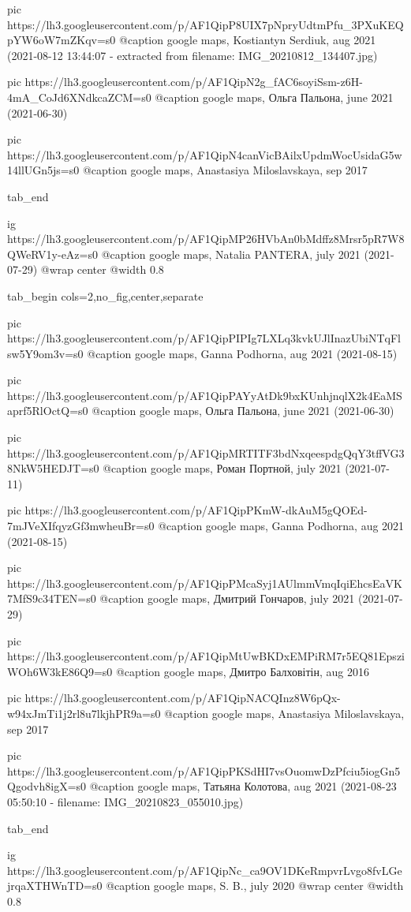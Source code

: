 		 pic https://lh3.googleusercontent.com/p/AF1QipP8UIX7pNpryUdtmPfu_3PXuKEQpYW6oW7mZKqv=s0
		 @caption google maps, Kostiantyn Serdiuk, aug 2021 (2021-08-12 13:44:07 - extracted from filename: IMG_20210812_134407.jpg)

		 pic https://lh3.googleusercontent.com/p/AF1QipN2g_fAC6soyiSsm-z6H-4mA_CoJd6XNdkcaZCM=s0
		 @caption google maps, Ольга Пальона, june 2021 (2021-06-30)

		 pic https://lh3.googleusercontent.com/p/AF1QipN4canVicBAilxUpdmWocUsidaG5w14llUGn5js=s0
		 @caption google maps, Anastasiya Miloslavskaya, sep 2017

  tab_end
\fi

\ifcmt
  ig https://lh3.googleusercontent.com/p/AF1QipMP26HVbAn0bMdffz8Mrsr5pR7W8QWeRV1y-eAz=s0
	@caption google maps, Natalia PANTERA, july 2021 (2021-07-29)
  @wrap center
  @width 0.8
\fi


\ifcmt
  tab_begin cols=2,no_fig,center,separate

		pic https://lh3.googleusercontent.com/p/AF1QipPIPIg7LXLq3kvkUJlInazUbiNTqFlsw5Y9om3v=s0
		@caption google maps, Ganna Podhorna, aug 2021 (2021-08-15)

		pic https://lh3.googleusercontent.com/p/AF1QipPAYyAtDk9bxKUnhjnqlX2k4EaMSaprf5RlOctQ=s0
		@caption google maps, Ольга Пальона, june 2021 (2021-06-30)

		pic https://lh3.googleusercontent.com/p/AF1QipMRTITF3bdNxqeespdgQqY3tffVG38NkW5HEDJT=s0
		@caption google maps, Роман Портной, july 2021 (2021-07-11)

		pic https://lh3.googleusercontent.com/p/AF1QipPKmW-dkAuM5gQOEd-7mJVeXIfqyzGf3mwheuBr=s0
		@caption google maps, Ganna Podhorna, aug 2021 (2021-08-15)

		pic https://lh3.googleusercontent.com/p/AF1QipPMcaSyj1AUlmmVmqIqiEhcsEaVK7MfS9c34TEN=s0
		@caption google maps, Дмитрий Гончаров, july 2021 (2021-07-29)

		pic https://lh3.googleusercontent.com/p/AF1QipMtUwBKDxEMPiRM7r5EQ81EpsziWOh6W3kE86Q9=s0
		@caption google maps, Дмитро Балховітін, aug 2016 

		pic https://lh3.googleusercontent.com/p/AF1QipNACQInz8W6pQx-w94xJmTi1j2rl8u7lkjhPR9a=s0
		@caption google maps, Anastasiya Miloslavskaya, sep 2017

		pic https://lh3.googleusercontent.com/p/AF1QipPKSdHI7vsOuomwDzPfciu5iogGn5Qgodvh8igX=s0
		@caption google maps, Татьяна Колотова, aug 2021 (2021-08-23 05:50:10 - filename: IMG_20210823_055010.jpg)

  tab_end
\fi

\ifcmt
	ig https://lh3.googleusercontent.com/p/AF1QipNc_ca9OV1DKeRmpvrLvgo8fvLGejrqaXTHWnTD=s0
	@caption google maps, S. B., july 2020
  @wrap center
  @width 0.8
\fi
